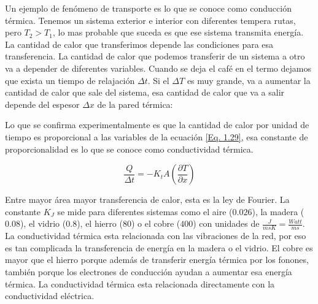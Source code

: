 \documentclass[11pt,fleqn]{book}
\begin{document}
Un ejemplo de fenómeno de transporte es lo que se conoce como conducción térmica. Tenemos un sistema exterior e interior con diferentes tempera rutas, pero $T_{2}>T_{1}$, lo mas probable que suceda es que ese sistema transmita energía. La cantidad de calor que transferimos depende las condiciones para esa transferencia. La cantidad de calor que podemos transferir de un sistema a otro va a depender de diferentes variables. Cuando se deja el café en el termo dejamos que exista un tiempo de relajación $\Delta t$. Si el $\Delta T$ es muy grande, va a aumentar la cantidad de calor que sale del sistema, esa cantidad de calor que va a salir depende del espesor $\Delta x$ de la pared térmica:
\begin{comment}

\begin{figure}[H]
    \begin{minipage}[c]{0.4\linewidth}
        \centering
        \texttt{[image: Sdf]}
        \caption{Caption}
        \label{Fig. 1.8}
    \end{minipage}
\begin{minipage}[c]{0.4\linewidth}
    \begin{equation}
        Q\propto\frac{\Delta tA\Delta T}{\Delta x}
        \label{Eq. 1.29}
    \end{equation}
\end{minipage}
\end{figure}

\end{comment}
Lo que se confirma experimentalmente es que la cantidad de calor por unidad de tiempo es proporcional a las variables de la ecuación \ref{Eq. 1.29}, esa constante de proporcionalidad es lo que se conoce como conductividad térmica.

\begin{equation}
    \frac{Q}{\Delta t}=-K_{t}A\left(\frac{\partial T}{\partial x}\right)
    \label{eq. 1.30}
\end{equation}

Entre mayor área mayor transferencia de calor, esta es la ley de Fourier. La constante $K_{J}$ se mide para diferentes sistemas como el aire ($0.026$), la madera ($0.08$), el vidrio ($0.8$), el hierro ($80$) o el cobre ($400$) con unidades de $\frac{J}{msK}=\frac{Watt}{ms}$. La conductividad térmica esta relacionada con las vibraciones de la red, por eso es tan complicada la transferencia de energía en la madera o el vidrio. El cobre es mayor que el hierro porque además de transferir energía térmica por los fonones, también porque los electrones de conducción ayudan a aumentar esa energía térmica. La conductividad térmica esta relacionada directamente con la conductividad eléctrica.
\end{document}
